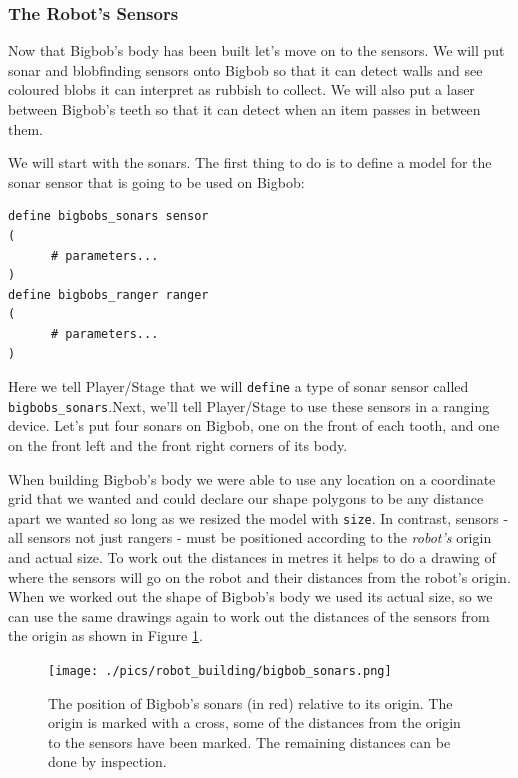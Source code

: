 \documentclass[a4paper]{report}
\newcommand{\plst}{Player/Stage\xspace}
\begin{document}
\subsubsection{The Robot's Sensors}\label{sec:BuildingAWorld:BuildingRobot:ExampleRobot:RobotSensors}
Now that Bigbob's body has been built let's move on to the sensors. We will put sonar and blobfinding sensors onto Bigbob so that it can detect walls and see coloured blobs it can interpret as rubbish to collect. We will also put a laser between Bigbob's teeth so that it can detect when an item passes in between them.

We will start with the sonars. The first thing to do is to define a model
for the sonar sensor that is going to be used on Bigbob:
\begin{verbatim}
define bigbobs_sonars sensor
(
      # parameters...
)
define bigbobs_ranger ranger
(
      # parameters...
)
\end{verbatim}
Here we tell \plst that we will \verb|define| a type of sonar sensor called \verb|bigbobs_sonars|.Next, we'll tell Player/Stage to use these sensors in a ranging device. Let's put four sonars on Bigbob, one on the front of each tooth, and one on the front left and the front right corners of its body. 

When building Bigbob's body we were able to use any location on a coordinate grid that we wanted and could declare our shape polygons to be any distance apart we wanted so long as we resized the model with \verb|size|. In contrast, sensors - all sensors not just rangers - must be positioned according to the \emph{robot's} origin and actual size. To work out the distances in metres it helps to do a drawing of where the sensors will go on the robot and their distances from the robot's origin. When we worked out the shape of Bigbob's body we used its actual size, so we can use the same drawings again to work out the distances of the sensors from the origin as shown in Figure \ref{fig:BuildingAWorld:BuildingRobot:RobotSensors:Sonars}.

\begin{figure}
	\centering
	\texttt{[image: ./pics/robot\_building/bigbob\_sonars.png]} 
	\caption{The position of Bigbob's sonars (in red) relative to its origin. The origin is marked with a cross, some of the distances from the origin to the sensors have been marked. The remaining distances can be done by inspection.}
	\label{fig:BuildingAWorld:BuildingRobot:RobotSensors:Sonars}
\end{figure}
\end{document}
